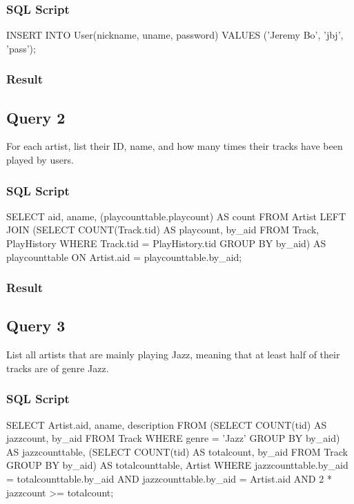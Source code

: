 \documentclass[letter, 12pt]{report}
\begin{document}
	\subsubsection{SQL Script}
	\begin{spverbatim}
		INSERT INTO User(nickname, uname, password) VALUES ('Jeremy Bo', 'jbj', 'pass');
	\end{spverbatim}
	\subsubsection{Result}
	
	\subsection{Query 2}
	For each artist, list their ID, name, and how many times their tracks have been played by users.
	\subsubsection{SQL Script}
	\begin{spverbatim}
		SELECT aid, aname, (playcounttable.playcount) AS count 
		FROM Artist LEFT JOIN
		(SELECT COUNT(Track.tid) AS playcount, by_aid 
		FROM Track, PlayHistory
		WHERE Track.tid = PlayHistory.tid
		GROUP BY by_aid) AS playcounttable
		ON Artist.aid = playcounttable.by_aid;
	\end{spverbatim}
	\subsubsection{Result}
	
	\subsection{Query 3}
	List all artists that are mainly playing Jazz, meaning that at least half of their tracks are of genre Jazz.
	\subsubsection{SQL Script}
	\begin{spverbatim}
		SELECT Artist.aid, aname, description FROM
		(SELECT COUNT(tid) AS jazzcount, by_aid
		FROM Track
		WHERE genre = 'Jazz'
		GROUP BY by_aid) AS jazzcounttable,
		(SELECT COUNT(tid) AS totalcount, by_aid
		FROM Track
		GROUP BY by_aid) AS totalcounttable, Artist
		WHERE jazzcounttable.by_aid = totalcounttable.by_aid
		AND jazzcounttable.by_aid = Artist.aid
		AND 2 * jazzcount >= totalcount;
	\end{spverbatim}
\end{document}
